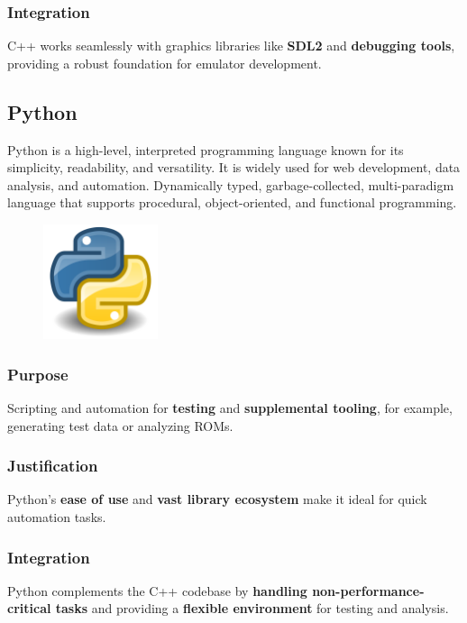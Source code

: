 \documentclass[a4paper, 11pt]{article}
\begin{document}
\subsubsection{Integration}
C++ works seamlessly with graphics libraries like \textbf{SDL2} and \textbf{debugging tools}, providing a robust foundation for emulator development.

\subsection{Python}
Python is a high-level, interpreted programming language known for its simplicity, readability, and versatility. It is widely used for web development, data analysis, and automation. Dynamically typed, garbage-collected, multi-paradigm language that supports procedural, object-oriented, and functional programming.

\begin{figure}[h]
    \centering
    \includegraphics[width=0.3\textwidth]{python.png}
\end{figure}

\subsubsection{Purpose}
Scripting and automation for \textbf{testing} and \textbf{supplemental tooling}, for example, generating test data or analyzing ROMs.

\subsubsection{Justification}
Python's \textbf{ease of use} and \textbf{vast library ecosystem} make it ideal for quick automation tasks.

\subsubsection{Integration}
Python complements the C++ codebase by \textbf{handling non-performance-critical tasks} and providing a \textbf{flexible environment} for testing and analysis.
\end{document}
